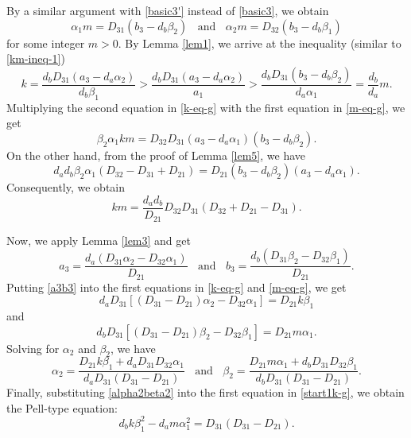 \documentclass[12pt]{article}
\begin{document}
By a similar argument with \eqref{basic3'} instead of \eqref{basic3}, we obtain
\begin{equation} \label{m-eq-g}
\alpha_1 m = D_{31} (b_3 - d_b \beta_2) \; \; \text{ and } \; \; \alpha_2 m = D_{32} (b_3 - d_b \beta_1)
\end{equation}
for some integer $m > 0$. By Lemma \ref{lem1}, we arrive at the inequality (similar to \eqref{km-ineq-1})
\begin{equation} \label{km-ineq-g}
k = \frac{d_b D_{31} (a_3 - d_a \alpha_2)}{d_b \beta_1} > \frac{d_b D_{31} (a_3 - d_a \alpha_2)}{a_1} > \frac{d_b D_{31}(b_3 - d_b \beta_2)}{d_a \alpha_1} = \frac{d_b}{d_a} m.
\end{equation}
Multiplying the second equation in \eqref{k-eq-g} with the first equation in \eqref{m-eq-g}, we get
\[
\beta_2 \alpha_1 k m = D_{32} D_{31} (a_3 - d_a \alpha_1) (b_3 - d_b \beta_2).
\]
On the other hand, from the proof of Lemma \ref{lem5}, we have
\[
d_a d_b \beta_2 \alpha_1 (D_{32} - D_{31} + D_{21}) = D_{21} (b_3 - d_b \beta_2)(a_3 - d_a \alpha_1).
\]
Consequently, we obtain
\begin{equation} \label{km-g}
k m = \frac{d_a d_b}{D_{21}}{D_{32} D_{31} (D_{32} +D_{21} - D_{31})} .
\end{equation}

Now, we apply Lemma \ref{lem3} and get
\begin{equation} \label{a3b3}
a_3 = \frac{d_a (D_{31} \alpha_2 - D_{32} \alpha_1)}{D_{21}} \; \; \text{ and } \; \; b_3 = \frac{d_b (D_{31} \beta_2 - D_{32} \beta_1)}{D_{21}}.
\end{equation}
Putting \eqref{a3b3} into the first equations in \eqref{k-eq-g} and \eqref{m-eq-g}, we get
\[
d_a D_{31} [(D_{31} - D_{21}) \alpha_2 - D_{32} \alpha_1] = D_{21} k \beta_1
\]
and
\[
d_b D_{31} [(D_{31} - D_{21}) \beta_2 - D_{32} \beta_1] = D_{21} m \alpha_1.
\]
Solving for $\alpha_2$ and $\beta_2$, we have
\begin{equation} \label{alpha2beta2}
\alpha_2 = \frac{D_{21} k \beta_1 + d_a D_{31} D_{32} \alpha_1}{d_a D_{31} (D_{31} - D_{21})} \; \; \text{ and } \; \; \beta_2 = \frac{D_{21} m \alpha_1 + d_b D_{31} D_{32} \beta_1}{d_b D_{31} (D_{31} - D_{21})}.
\end{equation}
Finally, substituting \eqref{alpha2beta2} into the first equation in \eqref{start1k-g}, we obtain the Pell-type equation:
\begin{equation} \label{pell-1-g}
d_b k \beta_1^2 - d_a m \alpha_1^2 = D_{31} (D_{31} - D_{21}).
\end{equation}
\end{document}
